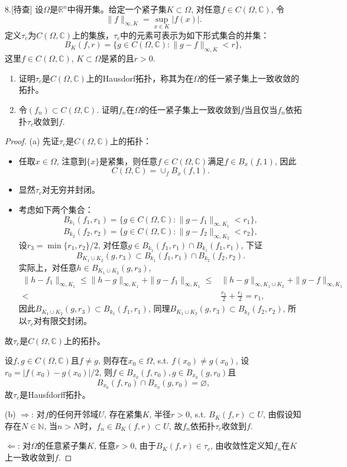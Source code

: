 \documentclass[a4paper,8pt]{ctexart}\textwidth 140mm \textheight 216mm
\newcommand{\8}{\infty}
\begin{document}
8.[待查] 设$\Omega$是$\mathbb{R}^n$中得开集。给定一个紧子集$K\subset \Omega$, 对任意$f\in C(\Omega,\mathbb{C})$, 令
$$\|f\|_{\infty,K}=\sup_{x\in K}|f(x)|.$$
定义$\tau_c$为$C(\Omega,\mathbb{C})$上的集族，$\tau_c$中的元素可表示为如下形式集合的并集：
$$B_K(f,r)=\{g\in C(\Omega,\mathbb{C}):\|g-f\|_{\infty,K}<r\},$$
这里$f\in C(\Omega,\mathbb{C})$, $K\subset\Omega$是紧的且$r>0$. 
\begin{enumerate}
	\item[(a)] 证明$\tau_c$是$C(\Omega,\mathbb{C})$上的Hausdorf拓扑，称其为在$\Omega$的任一紧子集上一致收敛的拓扑。
	\item[(b)] 令$(f_n)\subset C(\Omega,\mathbb{C})$. 证明$f_n$在$\Omega$的任一紧子集上一致收敛到$f$当且仅当$f_n$依拓扑$\tau_c$收敛到$f$.
\end{enumerate}
\begin{proof}
	(a) 先证$\tau_c$是$C(\Omega,\mathbb{C})$上的拓扑：
	\begin{itemize}
		\item 任取$x\in \Omega$, 注意到$\{x\}$是紧集，则任意$f\in C(\Omega,\mathbb{C})$满足$f\in B_{x}(f,1)$, 因此
		$$C(\Omega,\mathbb{C})=\cup_{f}B_{x}(f,1).$$
		\item 显然$\tau_c$对无穷并封闭。
		\item 考虑如下两个集合：
		\begin{equation*}
			B_{k_1}(f_1,r_1)=\{g\in C(\Omega,\mathbb{C}):\|g-f_1\|_{\infty,K_1}<r_1\},
		\end{equation*}
		$$B_{k_2}(f_2,r_2)=\{g\in C(\Omega,\mathbb{C}):\|g-f_2\|_{\infty,K_2}<r_2\},$$
		设$r_3=\min\{r_1,r_2\}/2$, 对任意$g\in B_{k_1}(f_1,r_1)\cap B_{k_1}(f_1,r_1)$, 下证
		$$B_{K_1\cup K_2}(g,r_3)\subset B_{k_1}(f_1,r_1)\cap B_{k_2}(f_2,r_2).$$
		实际上，对任意$h\in B_{K_1\cup K_2}(g,r_3)$, 
		\begin{equation*}
		\begin{split}
		\|h-f_1\|_{\infty,K_1}\leq \|h-g\|_{\infty,K_1}+\|g-f_1\|_{\infty,K_1}\leq& \|h-g\|_{\infty,K_1\cup K_2}+\|g-f\|_{\infty,K_1}\\
		<&\frac{r_1}{2}+\frac{r_1}{2}=r_1,
		\end{split}
		\end{equation*}
		因此$B_{K_1\cup K_2}(g,r_3)\subset B_{k_1}(f_1,r_1)$, 同理$B_{K_1\cup K_2}(g,r_3)\subset B_{k_2}(f_2,r_2)$, 所以$\tau_c$对有限交封闭。
	\end{itemize}
    故$\tau_c$是$C(\Omega,\mathbb{C})$上的拓扑。
    
    设$f,g\in C(\Omega,\mathbb{C})$且$f\ne g$, 则存在$x_0\in \Omega$, s.t. $f(x_0)\ne g(x_0)$, 设$r_0=|f(x_0)-g(x_0)|/2$, 则$f\in B_{x_0}(f,r_0),g\in B_{x_0}(g,r_0)$且
    $$B_{x_0}(f,r_0)\cap B_{x_0}(g,r_0)=\varnothing,$$
    故$\tau_c$是Hausfdorff拓扑。
    
    (b) $\Rightarrow$: 对$f$的任何开邻域$U$, 存在紧集$K$, 半径$r>0$, s.t. $B_{K}(f,r)\subset U$, 由假设知存在$N\in\mathbb{N}$, 当$n>N$时，$f_n\in B_K(f,r)\subset U$, 故$f_n$依拓扑$\tau_c$收敛到$f$.
    
    $\Leftarrow$: 对$\Omega$的任意紧子集$K$, 任意$r>0$, 由于$B_K(f,r)\in \tau_c$, 由收敛性定义知$f_n$在$K$上一致收敛到$f$. 
\end{proof}
\end{document}
